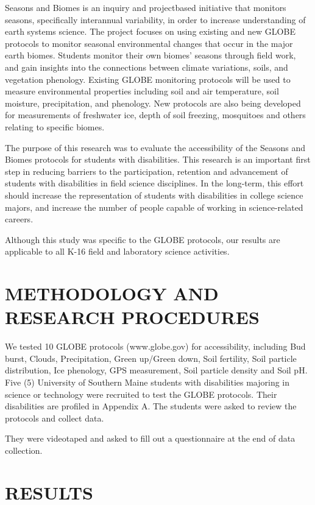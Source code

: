 \documentclass[11.5pt]{sig-alternate} %
\begin{document}
\begin{large}
Seasons and Biomes is an inquiry and projectbased initiative that monitors seasons, specifically interannual variability, in order to increase understanding of earth systems science. The project focuses on using existing and new GLOBE protocols to monitor seasonal environmental changes that occur in the major earth biomes. Students monitor their own biomes’ seasons through field work, and gain insights into the connections between climate variations, soils, and vegetation phenology. Existing GLOBE monitoring protocols will be used to measure environmental properties including soil and air temperature, soil moisture, precipitation, and phenology. New protocols are also being developed for measurements of freshwater ice, depth of soil freezing, mosquitoes and others relating to specific biomes.

The purpose of this research was to evaluate the accessibility of the Seasons and Biomes protocols for students with disabilities. This research is an important first step in reducing barriers to the participation, retention and advancement of students with disabilities in field science disciplines. In the long-term, this effort should increase the representation of students with disabilities in college science majors, and increase the number of people capable of working in science-related careers.

Although this study was specific to the GLOBE protocols, our results are applicable to all K-16 field and laboratory science activities. 

\section*{METHODOLOGY AND RESEARCH PROCEDURES}

We tested 10 GLOBE protocols (www.globe.gov) for accessibility, including Bud burst, Clouds, Precipitation, Green up/Green down, Soil fertility, Soil particle distribution, Ice phenology, GPS measurement, Soil particle density and Soil pH. Five (5) University of Southern Maine students with disabilities majoring in science or technology were recruited to test the GLOBE protocols. Their disabilities are profiled in Appendix A. The students were asked to review the protocols and collect data. 

They were videotaped and asked to fill out a questionnaire at the end of data collection. 

\section*{RESULTS}


\end{large}
\end{document}
